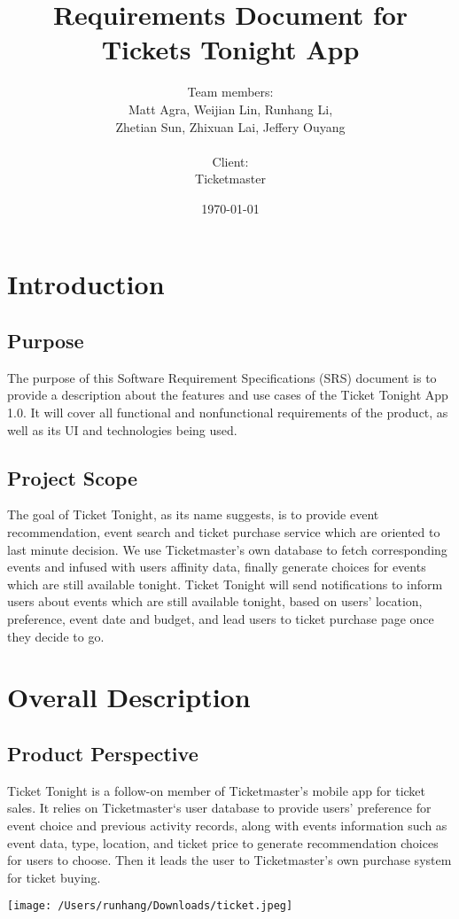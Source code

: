 \documentclass{article}
\title{Requirements Document for Tickets Tonight App}  %
\author{Team members: \\ Matt Agra, Weijian Lin, Runhang Li, \\Zhetian Sun, Zhixuan Lai, Jeffery Ouyang \\ \\ Client: \\Ticketmaster} %
\date{\today} %
\begin{document}
	
	\maketitle %
	

	\section{Introduction }
		\subsection{Purpose}
		 The purpose of this Software Requirement Specifications (SRS) document is to provide a description about the features and use cases of the Ticket Tonight App 1.0. It will cover all functional and nonfunctional requirements of the product, as well as its UI and technologies being used.
		 \subsection{Project Scope}
		 The goal of Ticket Tonight, as its name suggests, is to provide event recommendation, event search and ticket purchase service which are oriented to last minute decision. We use Ticketmaster’s own database to fetch corresponding events and infused with users affinity data, finally generate choices for events which are still available tonight.  Ticket Tonight will send notifications to inform users about events which are still available tonight, based on users’ location, preference, event date and budget, and lead users to ticket purchase page once they decide to go. 
		 
	\section{Overall Description}
		\subsection{Product Perspective}
		Ticket Tonight is a follow-on member of Ticketmaster’s mobile app for ticket sales. It relies on Ticketmaster‘s user database to provide users’ preference for event choice and previous activity records, along with events information such as event data, type, location, and ticket price to generate recommendation choices for users to choose. Then it leads the user to Ticketmaster’s own purchase system for ticket buying.
		\begin{center}
			\texttt{[image: /Users/runhang/Downloads/ticket.jpeg]}
		\end{center}
\end{document}

